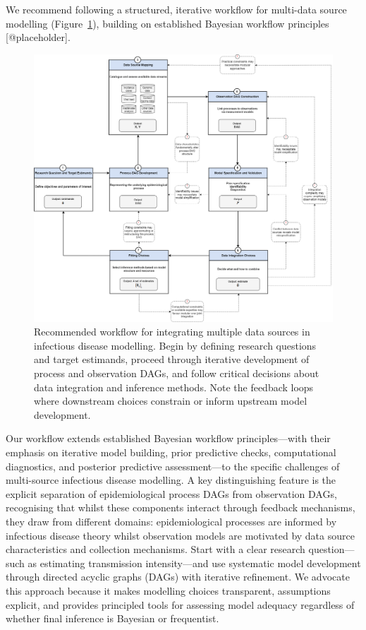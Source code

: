 \documentclass{article}
\begin{document}
We recommend following a structured, iterative workflow for multi-data source modelling (Figure~\ref{fig:workflow}), building on established Bayesian workflow principles [@placeholder].

\begin{figure}[htbp]
    \centering
    \includegraphics[width=\textwidth]{figures/visualization of core steps.drawio.png}
    \caption{Recommended workflow for integrating multiple data sources in infectious disease modelling. Begin by defining research questions and target estimands, proceed through iterative development of process and observation DAGs, and follow critical decisions about data integration and inference methods. Note the feedback loops where downstream choices constrain or inform upstream model development.}
    \label{fig:workflow}
\end{figure}

Our workflow extends established Bayesian workflow principles—with their emphasis on iterative model building, prior predictive checks, computational diagnostics, and posterior predictive assessment—to the specific challenges of multi-source infectious disease modelling.
A key distinguishing feature is the explicit separation of epidemiological process DAGs from observation DAGs, recognising that whilst these components interact through feedback mechanisms, they draw from different domains: epidemiological processes are informed by infectious disease theory whilst observation models are motivated by data source characteristics and collection mechanisms.
Start with a clear research question—such as estimating transmission intensity—and use systematic model development through directed acyclic graphs (DAGs) with iterative refinement.
We advocate this approach because it makes modelling choices transparent, assumptions explicit, and provides principled tools for assessing model adequacy regardless of whether final inference is Bayesian or frequentist.
\end{document}

